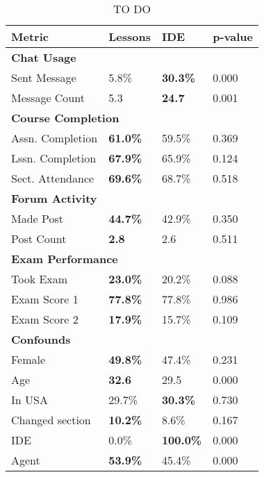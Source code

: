 \begin{table}[H]
\centering
\begin{tabularx}{\columnwidth}{l X X X}
\toprule
\textbf{Metric} & \textbf{Lessons} & \textbf{IDE} & \textbf{p-value} \\
\midrule
\multicolumn{4}{l}{\textbf{Chat Usage}} \\
Sent Message & 5.8\% & \textbf{30.3\%} & 0.000 \\
Message Count & 5.3 & \textbf{24.7} & 0.001 \\
\midrule
\multicolumn{4}{l}{\textbf{Course Completion}} \\
Assn. Completion & \textbf{61.0\%} & 59.5\% & 0.369 \\
Lssn. Completion & \textbf{67.9\%} & 65.9\% & 0.124 \\
Sect. Attendance & \textbf{69.6\%} & 68.7\% & 0.518 \\
\midrule
\multicolumn{4}{l}{\textbf{Forum Activity}} \\
Made Post & \textbf{44.7\%} & 42.9\% & 0.350 \\
Post Count & \textbf{2.8} & 2.6 & 0.511 \\
\midrule
\multicolumn{4}{l}{\textbf{Exam Performance}} \\
Took Exam & \textbf{23.0\%} & 20.2\% & 0.088 \\
Exam Score 1 & \textbf{77.8\%} & 77.8\% & 0.986 \\
Exam Score 2 & \textbf{17.9\%} & 15.7\% & 0.109 \\
\midrule
\multicolumn{4}{l}{\textbf{Confounds}} \\
Female & \textbf{49.8\%} & 47.4\% & 0.231 \\
Age & \textbf{32.6} & 29.5 & 0.000 \\
In USA & 29.7\% & \textbf{30.3\%} & 0.730 \\
Changed section & \textbf{10.2\%} & 8.6\% & 0.167 \\
IDE & 0.0\% & \textbf{100.0\%} & 0.000 \\
Agent & \textbf{53.9\%} & 45.4\% & 0.000 \\
\bottomrule
\end{tabularx}
\caption{TO DO}
\label{tab:to-do}
\end{table}